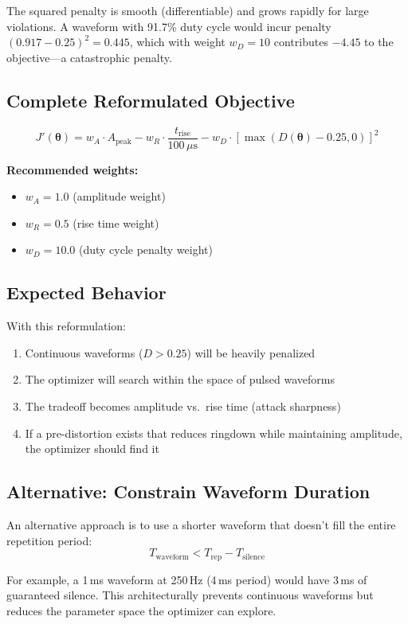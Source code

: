 \documentclass[11pt]{article}
\begin{document}
The squared penalty is smooth (differentiable) and grows rapidly for large violations. A waveform with 91.7\% duty cycle would incur penalty $(0.917 - 0.25)^2 = 0.445$, which with weight $w_D = 10$ contributes $-4.45$ to the objective---a catastrophic penalty.

\subsection{Complete Reformulated Objective}

\begin{equation}
    \boxed{
    J'(\boldsymbol{\theta}) = w_A \cdot A_{\text{peak}} - w_R \cdot \frac{t_{\text{rise}}}{100\,\mu\text{s}} - w_D \cdot \left[ \max\left( D(\boldsymbol{\theta}) - 0.25, 0 \right) \right]^2
    }
\end{equation}

\textbf{Recommended weights:}
\begin{itemize}
    \item $w_A = 1.0$ (amplitude weight)
    \item $w_R = 0.5$ (rise time weight)
    \item $w_D = 10.0$ (duty cycle penalty weight)
\end{itemize}

\subsection{Expected Behavior}

With this reformulation:
\begin{enumerate}
    \item Continuous waveforms ($D > 0.25$) will be heavily penalized
    \item The optimizer will search within the space of pulsed waveforms
    \item The tradeoff becomes amplitude vs.\ rise time (attack sharpness)
    \item If a pre-distortion exists that reduces ringdown while maintaining amplitude, the optimizer should find it
\end{enumerate}

\subsection{Alternative: Constrain Waveform Duration}

An alternative approach is to use a shorter waveform that doesn't fill the entire repetition period:
\begin{equation}
    T_{\text{waveform}} < T_{\text{rep}} - T_{\text{silence}}
\end{equation}

For example, a 1\,ms waveform at 250\,Hz (4\,ms period) would have 3\,ms of guaranteed silence. This architecturally prevents continuous waveforms but reduces the parameter space the optimizer can explore.
\end{document}
